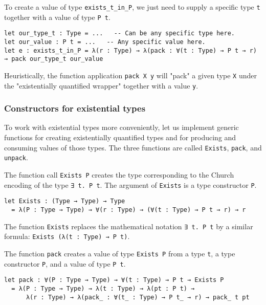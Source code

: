 To create a value of type \lstinline!exists_t_in_P!, we just need to supply a specific type \lstinline!t! together with a value of type \lstinline!P t!.


\begin{lstlisting}[language=Dhall]
let our_type_t : Type = ...   -- Can be any specific type here.
let our_value : P t = ...   -- Any specific value here.
let e : exists_t_in_P = λ(r : Type) → λ(pack : ∀(t : Type) → P t → r) → pack our_type_t our_value
\end{lstlisting}


Heuristically, the function application \lstinline!pack X y! will "pack" a given type \lstinline!X! under the "existentially quantified wrapper" together with a value \lstinline!y!.


\subsubsection{Constructors for existential types}


To work with existential types more conveniently, let us implement generic functions for creating existentially quantified types and for producing and consuming values of those types.
The three functions are called \lstinline!Exists!, \lstinline!pack!, and \lstinline!unpack!.


The function call \lstinline!Exists P! creates the type corresponding to the Church encoding of the type \lstinline!∃ t. P t!.
The argument of \lstinline!Exists! is a type constructor \lstinline!P!.


\begin{lstlisting}[language=Dhall]
let Exists : (Type → Type) → Type
  = λ(P : Type → Type) → ∀(r : Type) → (∀(t : Type) → P t → r) → r
\end{lstlisting}


The function \lstinline!Exists! replaces the mathematical notation \lstinline!∃ t. P t! by a similar formula: \lstinline!Exists (λ(t : Type) → P t)!. 


The function \lstinline!pack! creates a value of type \lstinline!Exists P! from a type \lstinline!t!, a type constructor \lstinline!P!, and a value of type \lstinline!P t!.


\begin{lstlisting}[language=Dhall]
let pack : ∀(P : Type → Type) → ∀(t : Type) → P t → Exists P
  = λ(P : Type → Type) → λ(t : Type) → λ(pt : P t) →
      λ(r : Type) → λ(pack_ : ∀(t_ : Type) → P t_ → r) → pack_ t pt
\end{lstlisting}



